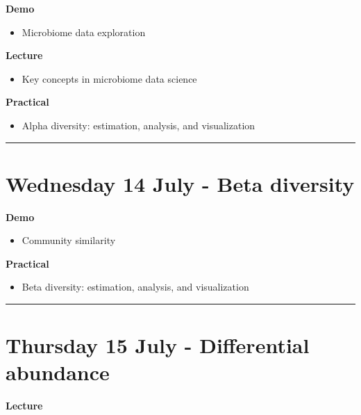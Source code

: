 \documentclass[
  oneside]{book}
\providecommand{\tightlist}{%
  \setlength{\itemsep}{0pt}\setlength{\parskip}{0pt}}
\begin{document}
\textbf{Demo}

\begin{itemize}
\tightlist
\item
  Microbiome data exploration
\end{itemize}

\textbf{Lecture}

\begin{itemize}
\tightlist
\item
  Key concepts in microbiome data science
\end{itemize}

\textbf{Practical}

\begin{itemize}
\tightlist
\item
  Alpha diversity: estimation, analysis, and visualization
\end{itemize}

\begin{center}\rule{0.5\linewidth}{0.5pt}\end{center}

\hypertarget{wednesday-14-july---beta-diversity}{%
\section{Wednesday 14 July - Beta diversity}\label{wednesday-14-july---beta-diversity}}

\textbf{Demo}

\begin{itemize}
\tightlist
\item
  Community similarity
\end{itemize}

\textbf{Practical}

\begin{itemize}
\tightlist
\item
  Beta diversity: estimation, analysis, and visualization
\end{itemize}

\begin{center}\rule{0.5\linewidth}{0.5pt}\end{center}

\hypertarget{thursday-15-july---differential-abundance}{%
\section{Thursday 15 July - Differential abundance}\label{thursday-15-july---differential-abundance}}

\textbf{Lecture}
\end{document}
